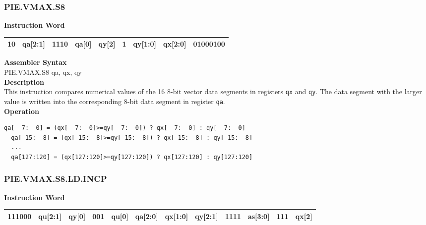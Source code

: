\newpage
\subsubsection{PIE.VMAX.S8}\label{instruction:PIEVMAXS8}
\setlength\tabcolsep{6pt}
\textbf{Instruction Word} \\
\begin{tabular}{|c|c|c|c|c|c|c|c|c|}
	\hline
	10 & qa[2:1] & 1110 & qa[0] & qy[2] & 1 & qy[1:0] & qx[2:0] & 01000100 \\
	\hline
\end{tabular}

\textbf{Assembler Syntax} \\
PIE.VMAX.S8 qa, qx, qy \\
\textbf{Description} \\
This instruction compares numerical values of the 16 8-bit vector data segments in registers \lstinline{qx} and \lstinline{qy}. The data segment with the larger value is written into the corresponding 8-bit data segment in register \lstinline{qa}.\\
\textbf{Operation}
\begin{lstlisting}[escapeinside=`?]
  qa[  7:  0] = (qx[  7:  0]>=qy[  7:  0]) ? qx[  7:  0] : qy[  7:  0]
  qa[ 15:  8] = (qx[ 15:  8]>=qy[ 15:  8]) ? qx[ 15:  8] : qy[ 15:  8]
  ...
  qa[127:120] = (qx[127:120]>=qy[127:120]) ? qx[127:120] : qy[127:120]
\end{lstlisting}

\newpage
\subsubsection{PIE.VMAX.S8.LD.INCP}\label{instruction:PIEVMAXS8LDINCP}
\setlength\tabcolsep{6pt}
\textbf{Instruction Word} \\
\begin{tabular}{|c|c|c|c|c|c|c|c|c|c|c|c|}
	\hline
	111000 & qu[2:1] & qy[0] & 001 & qu[0] & qa[2:0] & qx[1:0] & qy[2:1] & 1111 & as[3:0] & 111 & qx[2] \\
	\hline
\end{tabular}

